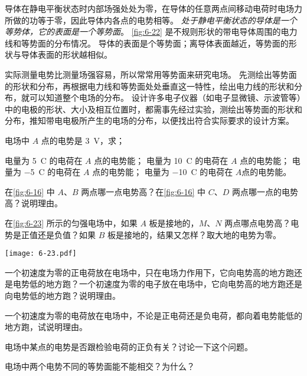 导体在静电平衡状态时内部场强处处为零，在导体的任意两点间移动电荷时电场力所做的功等于零，因此导体内各点的电势相等。
\emph{处于静电平衡状态的导体是一个等势体，它的表面是一个等势面}。
\cref{fig:6-22} 是不规则形状的带电导体周围的电力线和等势面的分布情况。
导体的表面是个等势面；离导体表面越近，等势面的形状与导体表面的形状越相似。

实际测量电势比测量场强容易，所以常常用等势面来研究电场。
先测绘出等势面的形状和分布，再根据电力线和等势面处处垂直这一特性，绘出电力线的形状和分布，就可以知道整个电场的分布。
设计许多电子仪器（如电子显微镜、示波管等）中的电极的形状、大小及相互位置时，都需事先经过实验，测绘出等势面的形状和分布，推知带电电极所产生的电场的分布，以便找出符合实际要求的设计方案。


\begin{Practice}
\begin{question}
	\item 电场中 $A$ 点的电势是 \qty{3}{V}，求；
	\begin{tasks}
		\task 电量为 \qty{5}{C} 的电荷在 $A$ 点的电势能；
		\task 电量为 \qty{10}{C} 的电荷在 $A$ 点的电势能；
		\task 电量为 \qty{-5}{C} 的电荷在 $A$ 点的电势能；
		\task 电量为 \qty{-10}{C} 的电荷在 $A $点的电势能。
	\end{tasks}
	\item 在\cref{fig:6-16} 中 $A$、$B$ 两点哪一点电势高？在\cref{fig:6-16} 中 $C$、$D$ 两点哪一点的电势高？说明理由。
	\item 在\cref{fig:6-23} 所示的匀强电场中，如果 $A$ 板是接地的，$M$、$N$ 两点哪点电势高？电势是正值还是负值？如果 $B$ 板是接地的，结果又怎样？取大地的电势为零。
	\begin{figurehere}
		\begin{minipage}{\linewidth}\centering
			\texttt{[image: 6-23.pdf]}
			\caption{}\label{fig:6-23}
		\end{minipage}
	\end{figurehere}	
	\item 一个初速度为零的正电荷放在电场中，只在电场力作用下，它向电势高的地方跑还是电势低的地方跑？一个初速度为零的电子放在电场中，它向电势高的地方跑还是向电势低的地方跑？说明理由。
	\item 一个初速度为零的电荷放在电场中，不论是正电荷还是负电荷，都向着电势能低的地方跑，试说明理由。
	\item 电场中某点的电势是否跟检验电荷的正负有关？讨论一下这个问题。
	\item 电场中两个电势不同的等势面能不能相交？为什么？
\end{question}
\end{Practice}

